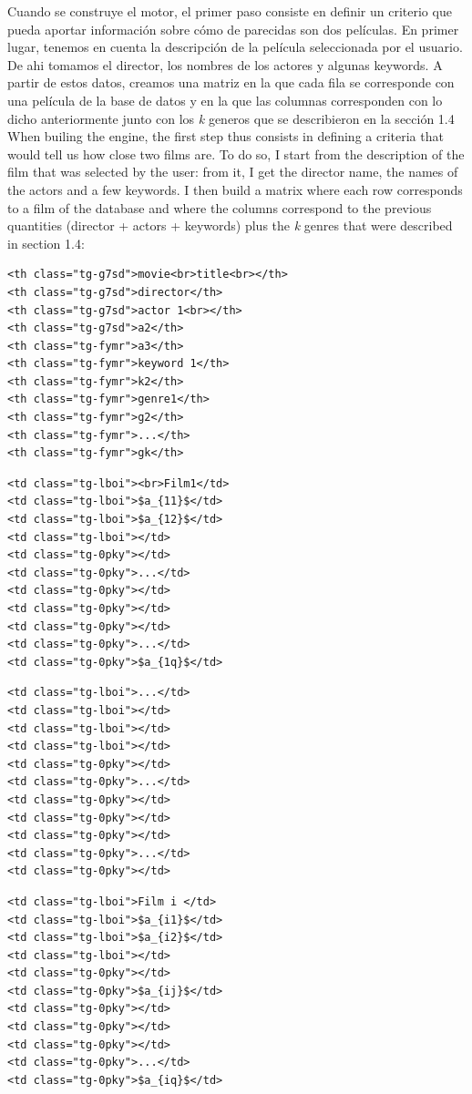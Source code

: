Cuando se construye el motor, el primer paso consiste en definir un
criterio que pueda aportar información sobre cómo de parecidas son dos
películas. En primer lugar, tenemos en cuenta la descripción de la
película seleccionada por el usuario. De ahi tomamos el director, los
nombres de los actores y algunas keywords. A partir de estos datos,
creamos una matriz en la que cada fila se corresponde con una película
de la base de datos y en la que las columnas corresponden con lo dicho
anteriormente junto con los \emph{k} generos que se describieron en la
sección 1.4 When builing the engine, the first step thus consists in
defining a criteria that would tell us how close two films are. To do
so, I start from the description of the film that was selected by the
user: from it, I get the director name, the names of the actors and a
few keywords. I then build a matrix where each row corresponds to a film
of the database and where the columns correspond to the previous
quantities (director + actors + keywords) plus the \emph{k} genres that
were described in section 1.4:

    \begin{verbatim}
<th class="tg-g7sd">movie<br>title<br></th>
<th class="tg-g7sd">director</th>
<th class="tg-g7sd">actor 1<br></th>
<th class="tg-g7sd">a2</th>
<th class="tg-fymr">a3</th>
<th class="tg-fymr">keyword 1</th>
<th class="tg-fymr">k2</th>
<th class="tg-fymr">genre1</th>
<th class="tg-fymr">g2</th>
<th class="tg-fymr">...</th>
<th class="tg-fymr">gk</th>
\end{verbatim}

\begin{verbatim}
<td class="tg-lboi"><br>Film1</td>
<td class="tg-lboi">$a_{11}$</td>
<td class="tg-lboi">$a_{12}$</td>
<td class="tg-lboi"></td>
<td class="tg-0pky"></td>
<td class="tg-0pky">...</td>
<td class="tg-0pky"></td>
<td class="tg-0pky"></td>
<td class="tg-0pky"></td>
<td class="tg-0pky">...</td>
<td class="tg-0pky">$a_{1q}$</td>
\end{verbatim}

\begin{verbatim}
<td class="tg-lboi">...</td>
<td class="tg-lboi"></td>
<td class="tg-lboi"></td>
<td class="tg-lboi"></td>
<td class="tg-0pky"></td>
<td class="tg-0pky">...</td>
<td class="tg-0pky"></td>
<td class="tg-0pky"></td>
<td class="tg-0pky"></td>
<td class="tg-0pky">...</td>
<td class="tg-0pky"></td>
\end{verbatim}

\begin{verbatim}
<td class="tg-lboi">Film i </td>
<td class="tg-lboi">$a_{i1}$</td>
<td class="tg-lboi">$a_{i2}$</td>
<td class="tg-lboi"></td>
<td class="tg-0pky"></td>
<td class="tg-0pky">$a_{ij}$</td>
<td class="tg-0pky"></td>
<td class="tg-0pky"></td>
<td class="tg-0pky"></td>
<td class="tg-0pky">...</td>
<td class="tg-0pky">$a_{iq}$</td>
\end{verbatim}

